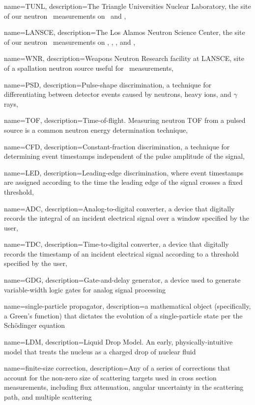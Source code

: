 {
    name={TUNL},
    description={The Triangle Universities Nuclear Laboratory, the site of our neutron \el\ 
        measurements on \snTwelve\ and \snFour},
}

{
    name={LANSCE},
    description={The Los Alamos Neutron Science Center, the site of our neutron \tot\ measurements on
    \oSixEight, \niEightFour, \rhThree, and \snTwelveFour},
}

{
    name={WNR},
    description={Weapons Neutron Research facility at LANSCE, site of a spallation neutron source
    useful for \tot\ measurements},
}

{
    name={PSD},
    description={Pulse-shape discrimination, a technique for differentiating between detector events
    caused by neutrons, heavy ions, and $\gamma$ rays},
}

{
    name={TOF},
    description={Time-of-flight. Measuring neutron TOF from a pulsed source is a common
    neutron energy determination technique},
}

{
    name={CFD},
    description={Constant-fraction discrimination, a technique for determining event timestamps
    independent of the pulse amplitude of the signal},
}

{
    name={LED},
    description={Leading-edge discrimination, where event timestamps are assigned according to the
    time the leading edge of the signal crosses a fixed threshold},
}

{
    name={ADC},
    description={Analog-to-digital converter, a device that digitally records the integral of an 
    incident electrical signal over a window specified by the user},
}

{
    name={TDC},
    description={Time-to-digital converter, a device that digitally records the timestamp of an
    incident electrical signal according to a threshold specified by the user},
}

{
    name={GDG},
    description={Gate-and-delay generator, a device used to generate
    variable-width logic gates for analog signal processing}
}

{
    name={single-particle propagator},
    description={a mathematical object (specifically, a Green's function) that dictates the 
    evolution of a single-particle state per the Sch\"odinger equation}
}

{
    name={LDM},
    description={Liquid Drop Model. An early, physically-intuitive model that treats the
    nucleus as a charged drop of nuclear fluid}
}

{
    name={finite-size correction},
    description={Any of a series of corrections that account for the
    non-zero size of scattering targets used in cross section measurements,
    including flux attenuation, angular uncertainty in the scattering path, and
    multiple scattering}
}
